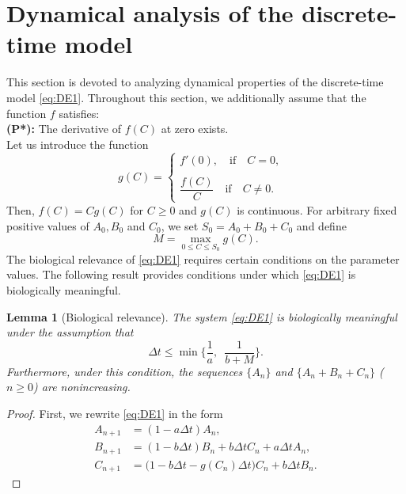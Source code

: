 \documentclass[12pt]{article}
\newtheorem{lemma}[theorem]{Lemma}
\theoremstyle{definition}
\theoremstyle{remark}
\numberwithin{equation}{section}
\begin{document}
\section{Dynamical analysis of the discrete-time model}\label{Sec2new}
{
This section is devoted to analyzing dynamical properties of the discrete-time model \eqref{eq:DE1}. Throughout this section, we additionally assume that the function $f$ satisfies:\\
\textbf{({P*}):} The derivative of $f(C)$ at zero exists.\\
Let us introduce the function
\begin{equation}\label{eq:DE0}
g(C) =
\begin{cases}
f'(0), \quad \mbox{if} \quad C = 0,\\
&\\
\dfrac{f(C)}{C} \quad \mbox{if} \quad C \ne 0.
\end{cases}
\end{equation}
Then, $f(C) = Cg(C)$ for $C \geq 0$ and $g(C)$ is continuous. For arbitrary fixed positive values of $A_0, B_0$ and $C_0$, we set $S_0 = A_0 + B_0 + C_0$ and define
\begin{equation}\label{eq:DE3}
M = \max_{0 \leq C \leq S_0}g(C).
\end{equation}
The biological relevance of \eqref{eq:DE1} requires certain conditions on the parameter values. The following result provides conditions under which \eqref{eq:DE1} is biologically meaningful.
\begin{lemma}[Biological relevance]\label{Lemma1}
The system \eqref{eq:DE1} is biologically meaningful under the assumption that
\begin{equation}\label{eq:DE2}
\Delta t \leq \min\bigg\{\dfrac{1}{a},\,\,\,\dfrac{1}{b + M}\bigg\}.
\end{equation}
Furthermore, under this condition, the sequences $\{A_n\}$ and $\{A_n + B_n + C_n\}$ ($n \geq 0$) are nonincreasing.
\end{lemma}
\begin{proof}
First, we rewrite \eqref{eq:DE1} in the form
\begin{equation}\label{eq:DE7}
\begin{split}
A_{n + 1} &= (1 -a\Delta t) A_n,\\
B_{n+1} &= (1 - b\Delta t)B_n + b\Delta t C_n + a\Delta t A_n,\\
C_{n + 1} &= \big(1 - b\Delta t - g(C_n)\Delta t\big)C_n +  b\Delta t B_n.
\end{split}

\end{equation}
\end{proof}}
\end{document}
